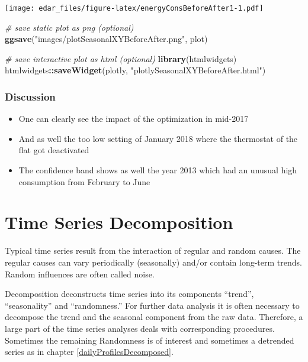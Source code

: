 \documentclass[
  a4paperpaper,
]{book}
\newenvironment{Shaded}{\begin{snugshade}}{\end{snugshade}}
\newcommand{\CommentTok}[1]{\textcolor[rgb]{0.56,0.35,0.01}{\textit{#1}}}
\newcommand{\KeywordTok}[1]{\textcolor[rgb]{0.13,0.29,0.53}{\textbf{#1}}}
\newcommand{\NormalTok}[1]{#1}
\newcommand{\OperatorTok}[1]{\textcolor[rgb]{0.81,0.36,0.00}{\textbf{#1}}}
\newcommand{\StringTok}[1]{\textcolor[rgb]{0.31,0.60,0.02}{#1}}
\let\oldShaded\Shaded
\let\endoldShaded\endShaded
\renewenvironment{Shaded}{\footnotesize\oldShaded}{\endoldShaded}
\begin{document}
\texttt{[image: edar\_files/figure-latex/energyConsBeforeAfter1-1.pdf]}

\begin{Shaded}
\begin{Highlighting}[]
\CommentTok{# save static plot as png (optional)}
\KeywordTok{ggsave}\NormalTok{(}\StringTok{"images/plotSeasonalXYBeforeAfter.png"}\NormalTok{, plot)}
\end{Highlighting}
\end{Shaded}

\begin{Shaded}
\begin{Highlighting}[]
\CommentTok{# save interactive plot as html (optional)}
\KeywordTok{library}\NormalTok{(htmlwidgets)}
\NormalTok{htmlwidgets}\OperatorTok{::}\KeywordTok{saveWidget}\NormalTok{(plotly, }\StringTok{"plotlySeasonalXYBeforeAfter.html"}\NormalTok{)}
\end{Highlighting}
\end{Shaded}

\hypertarget{discussion-3}{%
\subsection{Discussion}\label{discussion-3}}

\begin{itemize}
\item
  One can clearly see the impact of the optimization in mid-2017
\item
  And as well the too low setting of January 2018 where the thermostat of the flat got deactivated
\item
  The confidence band shows as well the year 2013 which had an unusual high consumption from February to June
\end{itemize}

\hypertarget{time-series-decomposition}{%
\chapter{Time Series Decomposition}\label{time-series-decomposition}}

Typical time series result from the interaction of regular and random causes. The regular causes can vary periodically (seasonally) and/or contain long-term trends. Random influences are often called noise.

Decomposition deconstructs time series into its components ``trend'', ``seasonality'' and ``randomness.'' For further data analysis it is often necessary to decompose the trend and the seasonal component from the raw data. Therefore, a large part of the time series analyses deals with corresponding procedures. Sometimes the remaining Randomness is of interest and sometimes a detrended series as in chapter \ref{dailyProfilesDecomposed}.
\end{document}
